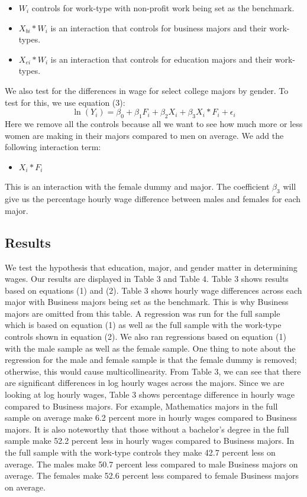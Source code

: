 \documentclass[12pt]{article}
\begin{document}
\begin{itemize}
\item $W_i$ controls for work-type with non-profit work being set as the benchmark.
\item $X_{bi}*W_i$ is an interaction that controls for business majors and their work-types.
\item $X_{ei}*W_i$ is an interaction that controls for education majors and their work-types.
\end{itemize}
We also test for the differences in wage for select college majors by gender. To test for this, we use equation (3):
\begin{equation}
\ln(Y_i) = \beta_0 + \beta_1F_i + \beta_2X_i + \beta_3X_i*F_i + \epsilon_i
\end{equation}
Here we remove all the controls because all we want to see how much more or less women are making in their majors compared to men on average. We add the following interaction term:
\begin{itemize}
\item $X_i*F_i$
\end{itemize} 
This is an interaction with the female dummy and major. The coefficient $\beta_3$ will give us the percentage hourly wage difference between males and females for each major.
\subsection{Results}
\par We test the hypothesis that education, major, and gender matter in determining wages. Our results are displayed in Table 3 and Table 4. Table 3 shows results based on equations (1) and (2). Table 3 shows hourly wage differences across each major with Business majors being set as the benchmark. This is why Business majors are omitted from this table. A regression was run for the full sample which is based on equation (1) as well as the full sample with the work-type controls shown in equation (2). We also ran regressions based on equation (1) with the male sample as well as the female sample. One thing to note about the regression for the male and female sample is that the female dummy is removed; otherwise, this would cause multicollinearity. From Table 3, we can see that there are significant differences in log hourly wages across the majors. Since we are looking at log hourly wages, Table 3 shows percentage difference in hourly wage compared to Business majors. For example, Mathematics majors in the full sample on average make 6.2 percent more in hourly wages compared to Business majors. It is also noteworthy that those without a bachelor's degree in the full sample make 52.2 percent less in hourly wages compared to Business majors. In the full sample with the work-type controls they make 42.7 percent less on average. The males make 50.7 percent less compared to male Business majors on average. The females make 52.6 percent less compared to female Business majors on average. 
\end{document}
